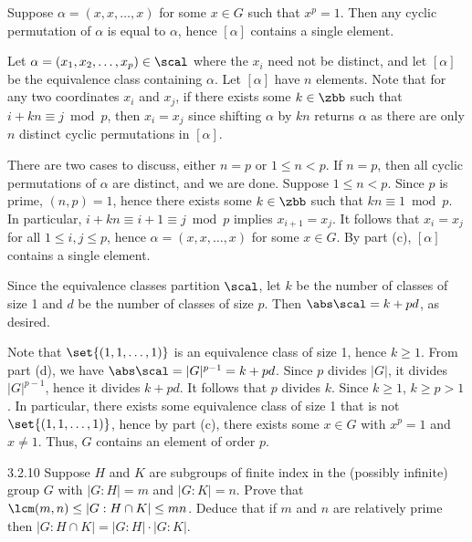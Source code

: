 \begin{solenum}[spsol]
	\leftimp Suppose $\alpha = (x, x, \dots, x)$ for some $x \in G$ such that $x^p = 1$.
	Then any cyclic permutation of $\alpha$ is equal to $\alpha$, hence $[\alpha]$ contains a single element.
    \item Let $\alpha = (x_1, x_2, \dots, x_p) \in \scal$ where the $x_i$ need not be distinct, and let $[\alpha]$ be the equivalence class containing $\alpha$.
	Let $[\alpha]$ have $n$ elements.
	Note that for any two coordinates $x_i$ and $x_j$, if there exists some $k \in \zbb$ such that $i + kn \equiv j \bmod p$, then $x_i = x_j$ since shifting $\alpha$ by $kn$ returns $\alpha$ as there are only $n$ distinct cyclic permutations in $[\alpha]$.
    
    There are two cases to discuss, either $n = p$ or $1 \leq n < p$.
	If $n = p$, then all cyclic permutations of $\alpha$ are distinct, and we are done.
	Suppose $1 \leq n < p$.
	Since $p$ is prime, $(n, p) = 1$, hence there exists some $k \in \zbb$ such that $kn \equiv 1 \bmod p$.
	In particular, $i + kn \equiv i + 1 \equiv j \bmod p$ implies $x_{i + 1} = x_j$.
	It follows that $x_i = x_j$ for all $1 \leq i, j \leq p$, hence $\alpha = (x, x, \dots, x)$ for some $x \in G$.
	By part (c), $[\alpha]$ contains a single element.

    Since the equivalence classes partition $\scal$, let $k$ be the number of classes of size 1 and $d$ be the number of classes of size $p$.
	Then $\abs\scal = k + pd$, as desired.
    \item Note that $\set{(1, 1, \dots, 1)}$ is an equivalence class of size 1, hence $k \geq 1$.
	From part (d), we have $\abs\scal = |G|^{p-1} = k + pd$.
	Since $p$ divides $|G|$, it divides $|G|^{p-1}$, hence it divides $k + pd$.
	It follows that $p$ divides $k$.
	Since $k \geq 1$, $k \geq p > 1$.
	In particular, there exists some equivalence class of size 1 that is not $\set{(1, 1, \dots, 1)}$, hence by part (c), there exists some $x \in G$ with $x^p = 1$ and $x \neq 1$.
	Thus, $G$ contains an element of order $p$.
\end{solenum}

\begin{spex}{3.2.10}
    Suppose $H$ and $K$ are subgroups of finite index in the (possibly infinite) group $G$ with $|G : H| = m$ and $|G : K| = n$.
	Prove that $\lcm(m, n) \leq |G : H \cap K| \leq mn$.
	Deduce that if $m$ and $n$ are relatively prime then $|G : H \cap K| = |G : H| \cdot |G : K|$.
\end{spex}

